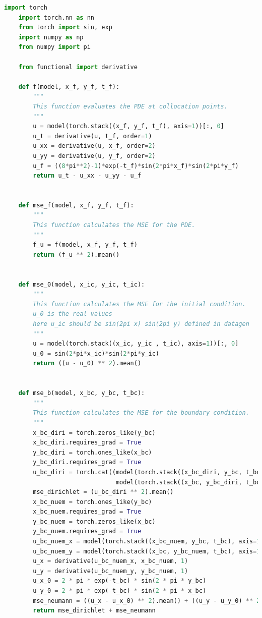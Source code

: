 \documentclass[11pt, a4paper]{article}
\begin{document}
    \lstset{style=mystyle}
    \begin{lstlisting}[language=Python, caption=Implementation of MSEs using PyTorch, label={lst:mse}]
    import torch
    import torch.nn as nn
    from torch import sin, exp
    import numpy as np
    from numpy import pi

    from functional import derivative

    def f(model, x_f, y_f, t_f):
        """
        This function evaluates the PDE at collocation points.
        """
        u = model(torch.stack((x_f, y_f, t_f), axis=1))[:, 0]
        u_t = derivative(u, t_f, order=1)
        u_xx = derivative(u, x_f, order=2)
        u_yy = derivative(u, y_f, order=2)
        u_f = ((8*pi**2)-1)*exp(-t_f)*sin(2*pi*x_f)*sin(2*pi*y_f)
        return u_t - u_xx - u_yy - u_f


    def mse_f(model, x_f, y_f, t_f):
        """
        This function calculates the MSE for the PDE.
        """
        f_u = f(model, x_f, y_f, t_f)
        return (f_u ** 2).mean()


    def mse_0(model, x_ic, y_ic, t_ic):
        """
        This function calculates the MSE for the initial condition.
        u_0 is the real values
        here u_ic should be sin(2pi x) sin(2pi y) defined in datagen
        """
        u = model(torch.stack((x_ic, y_ic , t_ic), axis=1))[:, 0]
        u_0 = sin(2*pi*x_ic)*sin(2*pi*y_ic)
        return ((u - u_0) ** 2).mean()


    def mse_b(model, x_bc, y_bc, t_bc):
        """
        This function calculates the MSE for the boundary condition.
        """
        x_bc_diri = torch.zeros_like(y_bc)
        x_bc_diri.requires_grad = True
        y_bc_diri = torch.ones_like(x_bc)
        y_bc_diri.requires_grad = True
        u_bc_diri = torch.cat((model(torch.stack((x_bc_diri, y_bc, t_bc), axis=1))[:, 0],
                               model(torch.stack((x_bc, y_bc_diri, t_bc), axis=1))[:, 0]))
        mse_dirichlet = (u_bc_diri ** 2).mean()
        x_bc_nuem = torch.ones_like(y_bc)
        x_bc_nuem.requires_grad = True
        y_bc_nuem = torch.zeros_like(x_bc)
        y_bc_nuem.requires_grad = True
        u_bc_nuem_x = model(torch.stack((x_bc_nuem, y_bc, t_bc), axis=1))[:, 0]
        u_bc_nuem_y = model(torch.stack((x_bc, y_bc_nuem, t_bc), axis=1))[:, 0]
        u_x = derivative(u_bc_nuem_x, x_bc_nuem, 1)
        u_y = derivative(u_bc_nuem_y, y_bc_nuem, 1)
        u_x_0 = 2 * pi * exp(-t_bc) * sin(2 * pi * y_bc)
        u_y_0 = 2 * pi * exp(-t_bc) * sin(2 * pi * x_bc)
        mse_neumann = ((u_x - u_x_0) ** 2).mean() + ((u_y - u_y_0) ** 2).mean()
        return mse_dirichlet + mse_neumann
    \end{lstlisting}
\end{document}
